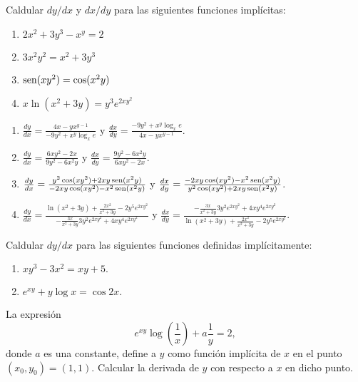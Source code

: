 {Caldular $dy/dx$ y $dx/dy$ para las siguientes funciones implícitas:
\begin{enumerate}
\item $2x^2+3y^3-x^y= 2$
\item $3x^2y^2 = x^2 + 3y^3$
\item $\operatorname{sen} (xy^2) = \cos(x^2y)$
\item $x \ln (x^2+3y)  = y^3e^{2xy^2}$
\end{enumerate}
}
{\begin{enumerate}
\item $\frac{dy}{dx} = \frac{4x-yx^{y-1}}{-9y^2+x^y\log_x e}$ y $\frac{dx}{dy} = \frac{-9y^2+x^y\log_x e}{4x-yx^{y-1}}$.
\item $\frac{dy}{dx} = \frac{6xy^2-2x}{9y^2-6x^2y}$ y $\frac{dx}{dy} = \frac{9y^2-6x^2y}{6xy^2-2x}$.
\item $\frac{dy}{dx} = \frac{y^2\cos(xy^2)+2xy\operatorname{sen}(x^2y)}{-2xy\cos(xy^2)-x^2\operatorname{sen}(x^2y)}$ y $\frac{dx}{dy} = \frac{-2xy\cos(xy^2)-x^2\operatorname{sen}(x^2y)}{y^2\cos(xy^2)+2xy\operatorname{sen}(x^2y)}$.
\item $\frac{dy}{dx} = \frac{\ln(x^2+3y)+\frac{2x^2}{x^2+3y}-2y^5e^{2xy^2}}{-\frac{3x}{x^2+3y}3y^2e^{2xy^2}+4xy^4e^{2xy^2}}$ y $\frac{dx}{dy} = \frac{-\frac{3x}{x^2+3y}3y^2e^{2xy^2}+4xy^4e^{2xy^2}}{\ln(x^2+3y)+\frac{2x^2}{x^2+3y}-2y^5e^{2xy^2}}$.
\end{enumerate}
}
{
}


{Caldular $dy/dx$ para las siguientes funciones definidas implícitamente:
\begin{enumerate}
\item  $xy^{3}-3x^{2}=xy+5.$
\item  $e^{xy}+y\log x=\cos 2x.$
\end{enumerate}
}


{La expresión
\[
e^{xy}\log \left( \dfrac{1}{x}\right) +a\dfrac{1}{y}=2,
\]
donde $a$ es una constante, define a $y$ como función implícita de $x $ en el punto $\left( x_{0},y_{0}\right) =\left( 1,1\right) .$
Calcular la derivada de $y$ con respecto a $x$ en dicho punto.
}

